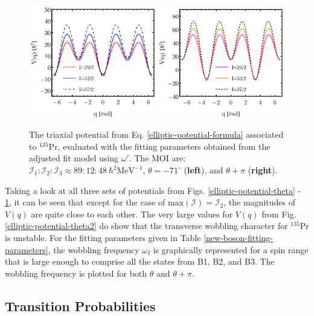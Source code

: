 \begin{figure}
    \centering
    \includegraphics[width=0.49\textwidth]{Chapters/Figures/potential-fit3-theta.pdf}
    \includegraphics[width=0.49\textwidth]{Chapters/Figures/potential-fit3-theta-pi.pdf}
    \caption{The triaxial potential from Eq. \ref{elliptic-potential-formula} associated to $^{135}$Pr, evaluated with the fitting parameters obtained from the adjusted fit model using $\omega'$. The MOI are: $\mathcal{I}_1:\mathcal{I}_2:\mathcal{I}_3\approx89:12:48\ \hbar^2\text{MeV}^{-1}$, $\theta=-71^\circ$ (\textbf{left}), and $\theta+\pi$ (\textbf{right}).}
    \label{elliptic-potential-theta3}
\end{figure}

Taking a look at all three sets of potentials from Figs. \ref{elliptic-potential-theta} - \ref{elliptic-potential-theta3}, it can be seen that except for the case of $\text{max}(\mathcal{I})=\mathcal{I}_2$, the magnitudes of $V(q)$ are quite close to each other. The very large values for $V(q)$ from Fig. \ref{elliptic-potential-theta2} do show that the transverse wobbling character for $^{135}$Pr is unstable. For the fitting parameters given in Table \ref{new-boson-fitting-parameters}, the wobbling frequency $\omega_I$ is graphically represented for a spin range that is large enough to comprise all the states from B1, B2, and B3. The wobbling frequency is plotted for both $\theta$ and $\theta+\pi$.

\subsection{Transition Probabilities}